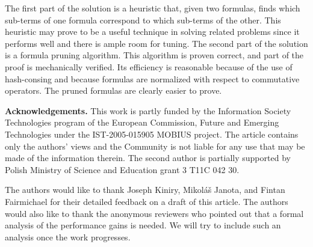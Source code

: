 \documentclass{llncs}
\begin{document}
The first part of the solution is a heuristic that, given
two formulas, finds which sub-terms of one formula correspond
to which sub-terms of the other. This heuristic may prove to be
a useful technique in solving related problems since it
performs well and there is ample room for tuning. The second
part of the solution is a formula pruning algorithm. This
algorithm is proven correct, and part of the proof is 
mechanically verified. Its efficiency is reasonable because
of the use of hash-consing and because formulas are normalized
with respect to commutative operators. The pruned formulas 
are clearly easier to prove.

\bigskip{}\noindent\textbf{Acknowledgements.}
This work is partly funded by the Information Society Technologies 
program of the European Commission, Future and Emerging
Technologies under the IST-2005-015905 MOBIUS project. 
The article contains only the authors' views and the Community
is not liable for any use that may be made of the information
therein. The second author is partially supported by Polish 
Ministry of Science and Education grant 3 T11C 042 30.


The authors would like to thank Joseph Kiniry, Mikol\'a\v s
Janota, and Fintan Fairmichael for their detailed feedback
on a draft of this article. The authors would also like to
thank the anonymous reviewers who pointed out that a formal
analysis of the performance gains is needed. We will try to
include such an analysis once the work progresses.


\end{document}
